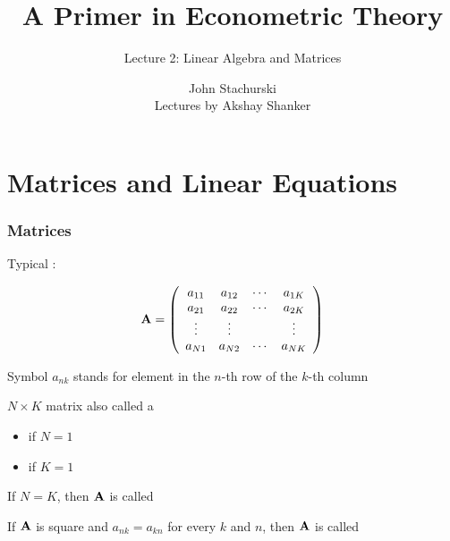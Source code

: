 






\title{A Primer in Econometric Theory}

\subtitle
{Lecture 2: Linear Algebra and Matrices}

\author{John Stachurski \\ \tiny Lectures by Akshay Shanker}






\begin{frame}
  \titlepage
\end{frame}

\section{Matrices and Linear Equations}

\begin{frame}
    
    \vspace{2em}
    \frametitle{Matrices}

    Typical : 
    
    \begin{equation*}
        \mathbf A = 
        \left(
        \begin{array}{cccc}
            a_{11} & a_{12} & \cdots & a_{1K} \\
            a_{21} & a_{22} & \cdots & a_{2K} \\
            \vdots & \vdots &  & \vdots \\
            a_{N1} & a_{N2} & \cdots & a_{NK} 
        \end{array}
        \right)
    \end{equation*}
    
    \vspace{.7em}
    Symbol $a_{nk}$ stands for element in the $n$-th row of the $k$-th column

\end{frame}


\begin{frame}
    
    \vspace{2em}
    $N \times K$ matrix also called a 
    \begin{itemize}
        \item {} if $N = 1$
        \item {} if $K = 1$
    \end{itemize}
    
    \vspace{.7em}
    If $N = K$, then $\mathbf A$ is called 
    
    If $\mathbf A$ is square and $a_{nk} = a_{kn}$ for every $k$ and $n$, then $\mathbf A$ is called    
    
\end{frame}

